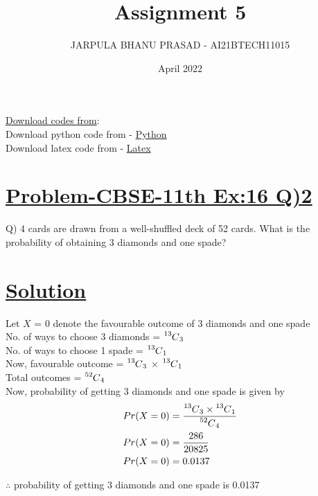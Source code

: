 \documentclass[journal,12pt,twocolumn]{IEEEtran}
\title{Assignment 5}
\author{JARPULA BHANU PRASAD - AI21BTECH11015}
\date{April 2022}
\newcommand\Mycomb[2][^n]{\prescript{#1\mkern-0.5mu}{}C_{#2}}
\begin{document}
\maketitle
\noindent \Large\underline{Download codes from}:\\
\noindent \large Download python code from - \href{https://github.com/jarpula-Bhanu/Assignment-5/blob/main/codes/verify.py}{Python}\\ Download latex code from - \href{https://github.com/jarpula-Bhanu/Assignment-5/blob/main/Assignment5.tex}{Latex}
\section{\large\underline{Problem-CBSE-11th Ex:16 Q)2}}
\large \noindent Q) 4 cards are drawn from a well-shuffled deck of 52 cards. What is the probability of obtaining 3 diamonds and one spade?
\section{\large\underline{Solution}}
\noindent Let $X$ = 0 denote the favourable outcome of 3 diamonds and one spade \\
No. of ways to choose 3 diamonds = $\Mycomb[13]{3}$ \\
No. of ways to choose 1 spade = $\Mycomb[13]{1}$ \\
Now, favourable outcome = $\Mycomb[13]{3}$ $\times$ $\Mycomb[13]{1}$\\
Total outcomes = $\Mycomb[52]{4}$ \\

Now, probability of getting 3 diamonds and one spade is given by
\begin{align}
& Pr(X = 0) = \frac{\Mycomb[13]{3} \times \Mycomb[13]{1}}{\Mycomb[52]{4}} \\
& Pr(X = 0) = \frac{286}{20825} \\
& Pr(X = 0) = 0.0137
\end{align}

\noindent $\therefore$ probability of getting 3 diamonds and one spade is 0.0137
\end{document}
